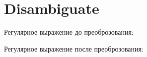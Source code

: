 \section{Disambiguate}
\begin{frame}{}
	Регулярное выражение до преоброзования:


	Регулярное выражение после преоброзования:

\end{frame}
